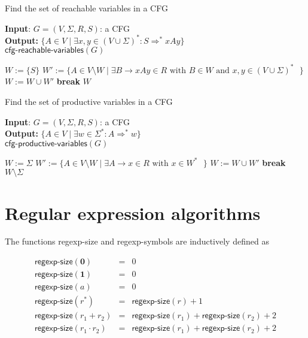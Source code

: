 \documentclass[11pt]{article}
\begin{document}
\clearpage

\begin{algorithm}
\small
\caption{Find the set of reachable variables in a CFG}
\vspace*{1ex}
{\textbf{Input}:}
$G = (V, \Sigma, R, S)$: a CFG \\
\textbf{Output:}
$\{ A \in V \mid \exists x,y \in (V \cup \Sigma)^\ast: S \Rightarrow^\ast xAy \}$ \\

$\textsf{cfg-reachable-variables}(G)$
\begin{algorithmic}[1]
\State $W := \{ S \}$
  \State $W' := \{ A \in V \setminus W \mid \exists B \rightarrow xAy \in R \text{ with $B \in W$ and $x,y \in (V \cup \Sigma)^\ast$ } \}$
  \State $W := W \cup W'$
    \State \textbf{break}
  \EndIf
\EndWhile
\State \Return $W$
\end{algorithmic}
\end{algorithm}

\begin{algorithm}
\small
\caption{Find the set of productive variables in a CFG}
\vspace*{1ex}
{\textbf{Input}:}
$G = (V, \Sigma, R, S)$: a CFG \\
\textbf{Output:}
$\{ A \in V \mid \exists w \in \Sigma^\ast: A \Rightarrow^\ast w \}$ \\

$\textsf{cfg-productive-variables}(G)$
\begin{algorithmic}[1]
\State $W := \Sigma$
  \State $W' := \{ A \in V \setminus W \mid \exists A \rightarrow x \in R \text{ with $x \in W^\ast$ } \}$
  \State $W := W \cup W'$
    \State \textbf{break}
  \EndIf
\EndWhile
\State \Return $W \setminus \Sigma$
\end{algorithmic}
\end{algorithm}

\newpage

\section{Regular expression algorithms}
The functions \textsf{regexp-size} and \textsf{regexp-symbols} are inductively defined as

\begin{equation*}
\begin{array}{lll}
\textsf{regexp-size}(\textbf{0}) &=& 0 \\
\textsf{regexp-size}(\textbf{1}) &=& 0 \\
\textsf{regexp-size}(a) &=& 0 \\
\textsf{regexp-size}(r^*) &=& \textsf{regexp-size}(r) + 1 \\
\textsf{regexp-size}(r_1 + r_2) &=& \textsf{regexp-size}(r_1) + \textsf{regexp-size}(r_2) + 2 \\
\textsf{regexp-size}(r_1 \cdot r_2) &=& \textsf{regexp-size}(r_1) + \textsf{regexp-size}(r_2) + 2 \\
\end{array}
\end{equation*}
\end{document}
